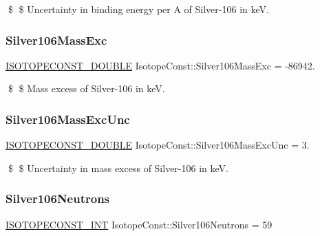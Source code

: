 \$ \$ Uncertainty in binding energy per A of Silver-\/106 in keV. \mbox{\label{group___isotope_const-_silver-_ag106_gab01f87a0eff8d471359c509344fb7a6a}} 
\subsubsection{\texorpdfstring{Silver106\+Mass\+Exc}{Silver106MassExc}}
{\footnotesize\ttfamily \mbox{\hyperlink{group___isotope_const-_macros_ga8f45a7272ce02c0b4c65c44636ed719a}{I\+S\+O\+T\+O\+P\+E\+C\+O\+N\+S\+T\+\_\+\+D\+O\+U\+B\+LE}} Isotope\+Const\+::\+Silver106\+Mass\+Exc = -\/86942.}

\$ \$ Mass excess of Silver-\/106 in keV. \mbox{\label{group___isotope_const-_silver-_ag106_ga51d3d6ef9f353ab6162b0e23103598c4}} 
\subsubsection{\texorpdfstring{Silver106\+Mass\+Exc\+Unc}{Silver106MassExcUnc}}
{\footnotesize\ttfamily \mbox{\hyperlink{group___isotope_const-_macros_ga8f45a7272ce02c0b4c65c44636ed719a}{I\+S\+O\+T\+O\+P\+E\+C\+O\+N\+S\+T\+\_\+\+D\+O\+U\+B\+LE}} Isotope\+Const\+::\+Silver106\+Mass\+Exc\+Unc = 3.}

\$ \$ Uncertainty in mass excess of Silver-\/106 in keV. \mbox{\label{group___isotope_const-_silver-_ag106_gaf6bb4c72dc6ccc515da6b12441a94b42}} 
\subsubsection{\texorpdfstring{Silver106\+Neutrons}{Silver106Neutrons}}
{\footnotesize\ttfamily \mbox{\hyperlink{group___isotope_const-_macros_ga5f18360b3e99483a35c32d789e62621c}{I\+S\+O\+T\+O\+P\+E\+C\+O\+N\+S\+T\+\_\+\+I\+NT}} Isotope\+Const\+::\+Silver106\+Neutrons = 59}

